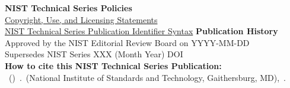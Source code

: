 \begin{titlepage}
\begin{flushleft}
\vfill
\footnotesize 
{\textbf{NIST Technical Series Policies}}\\
{\href{https://doi.org/10.6028/NIST-TECHPUBS.CROSSMARK-POLICY}{Copyright, Use, and Licensing Statements}\\
\href{https://www.nist.gov/nist-research-library/nist-technical-series-publications-author-instructions#pubid}{NIST Technical Series Publication Identifier Syntax}}
\vfill
{\textbf{Publication History}}\\
Approved by the NIST Editorial Review Board on YYYY-MM-DD\\
Supersedes NIST Series XXX (Month Year) DOI\\
\vfill
{\textbf{How to cite this NIST Technical Series Publication:}} \\
 \authorlist~(\pubyear)~\pubtitle.~(National Institute of Standards and Technology, Gaithersburg, MD),~\pubnumber.~ \DOI
\vfill


\end{flushleft}
\end{titlepage}
